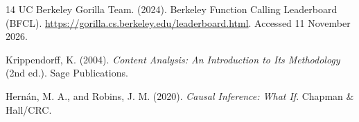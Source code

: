 \documentclass[11pt,a4paper]{article}
\begin{document}
\begin{thebibliography}{14}
UC Berkeley Gorilla Team. (2024).
\newblock Berkeley Function Calling Leaderboard (BFCL).
\newblock \url{https://gorilla.cs.berkeley.edu/leaderboard.html}. Accessed 11 November 2026.

Krippendorff, K. (2004).
\newblock \emph{Content Analysis: An Introduction to Its Methodology} (2nd ed.).
\newblock Sage Publications.

Hern\'an, M. A., and Robins, J. M. (2020).
\newblock \emph{Causal Inference: What If}.
\newblock Chapman \& Hall/CRC.

\end{thebibliography}
\end{document}
